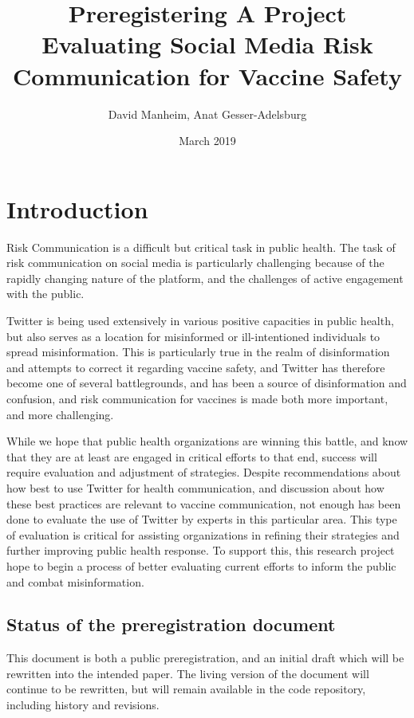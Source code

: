 \documentclass{article}
\title{Preregistering A Project Evaluating Social Media Risk Communication for Vaccine Safety}
\author{David Manheim, Anat Gesser-Adelsburg}
\date{March 2019}
\begin{document}
\maketitle

\section{Introduction}
Risk Communication is a difficult but critical task in public health. The task of risk communication on social media is particularly challenging because of the rapidly changing nature of the platform, and the challenges of active engagement with the public. 

Twitter is being used extensively in various positive capacities in public health\cite{Denecke2013,Paul2011, MORE}, but also serves as a location for misinformed or ill-intentioned individuals to spread misinformation\cite{Aymanns2017, Broniatowski2018, MORE}. This is particularly true in the realm of disinformation and attempts to correct it regarding vaccine safety, and Twitter has therefore become one of several battlegrounds, and has been a source of disinformation and confusion\cite{Broniatowski2018, MORE}, and risk communication for vaccines is made both more important, and more challenging.

While we hope that public health organizations are winning this battle, and know that they are at least are engaged in critical efforts to that end, success will require evaluation and adjustment of strategies. Despite recommendations about how best to use Twitter for health communication, and discussion about how these best practices are relevant to vaccine communication, not enough has been done to evaluate the use of Twitter by experts in this particular area. This type of evaluation is critical for assisting organizations in refining their strategies and further improving public health response. To support this, this research project hope to begin a process of better evaluating current efforts to inform the public and combat misinformation.

\subsection{Status of the preregistration document}
This document is both a public preregistration, and an initial draft which will be rewritten into the intended paper. The living version of the document will continue to be rewritten, but will remain available in the code repository, including history and revisions.
\end{document}
